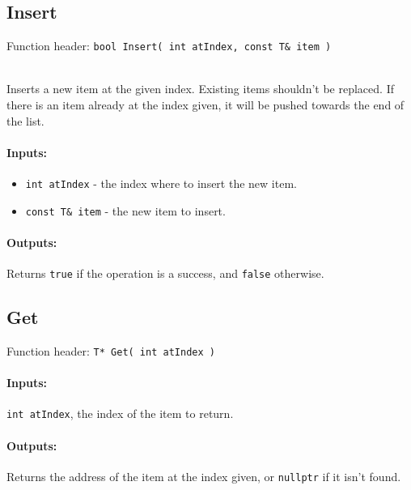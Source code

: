     \begin{framed}
    \subsection{Insert}

    Function header: \texttt{bool    Insert( int atIndex, const T\& item )}

    ~\\ Inserts a new item at the given index. Existing items shouldn't
    be replaced. If there is an item already at the index given, it will be
    pushed towards the end of the list.

    \paragraph{Inputs:}
        \begin{itemize}
            \item   \texttt{int atIndex} - the index where to insert the new item.
            \item   \texttt{const T\& item} - the new item to insert.
        \end{itemize}

    \paragraph{Outputs:}
        Returns \texttt{true} if the operation is a success, and \texttt{false} otherwise.

    \end{framed}

    \newpage
    
    \begin{framed}
    \subsection{Get}

    Function header: \texttt{T*      Get( int atIndex )}

    \paragraph{Inputs:}
        \texttt{int atIndex}, the index of the item to return.

    \paragraph{Outputs:}
        Returns the address of the item at the index given, or \texttt{nullptr} if it isn't found.

    \end{framed}
    
